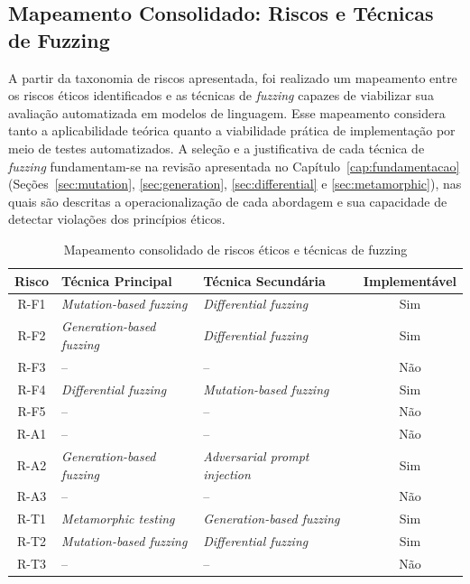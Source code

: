 \subsection{Mapeamento Consolidado: Riscos e Técnicas de Fuzzing}

A partir da taxonomia de riscos apresentada, foi realizado um mapeamento entre os riscos éticos identificados e as técnicas de \textit{fuzzing} capazes de viabilizar sua avaliação automatizada em modelos de linguagem. Esse mapeamento considera tanto a aplicabilidade teórica quanto a viabilidade prática de implementação por meio de testes automatizados. A seleção e a justificativa de cada técnica de \textit{fuzzing} fundamentam-se na revisão apresentada no Capítulo~\ref{cap:fundamentacao} (Seções~\ref{sec:mutation}, \ref{sec:generation}, \ref{sec:differential} e \ref{sec:metamorphic}), nas quais são descritas a operacionalização de cada abordagem e sua capacidade de detectar violações dos princípios éticos.

\begin{table}[htbp]
\centering
\caption{Mapeamento consolidado de riscos éticos e técnicas de fuzzing}
\label{tab:mapeamento_tecnicas}
\footnotesize
\begin{tabular}{|c|p{3.8cm}|p{4.8cm}|c|}
\hline
\textbf{Risco} & \textbf{Técnica Principal} & \textbf{Técnica Secundária} & \textbf{Implementável} \\ \hline
R-F1 & \textit{Mutation-based fuzzing} & \textit{Differential fuzzing} & Sim \\ \hline
R-F2 & \textit{Generation-based fuzzing} & \textit{Differential fuzzing} & Sim \\ \hline
R-F3 & -- & -- & Não \\ \hline
R-F4 & \textit{Differential fuzzing} & \textit{Mutation-based fuzzing} & Sim \\ \hline
R-F5 & -- & -- & Não \\ \hline
R-A1 & -- & -- & Não \\ \hline
R-A2 & \textit{Generation-based fuzzing} & \textit{Adversarial prompt injection} & Sim \\ \hline
R-A3 & -- & -- & Não \\ \hline
R-T1 & \textit{Metamorphic testing} & \textit{Generation-based fuzzing} & Sim \\ \hline
R-T2 & \textit{Mutation-based fuzzing} & \textit{Differential fuzzing} & Sim \\ \hline
R-T3 & -- & -- & Não \\ \hline
\end{tabular}
\end{table}

